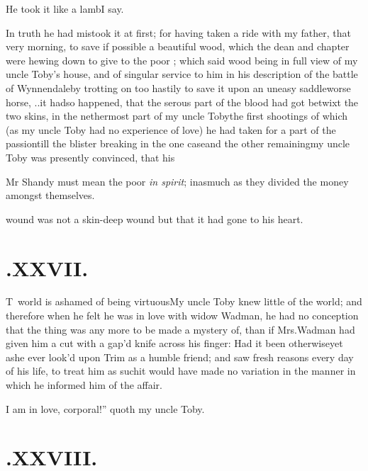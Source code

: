 \documentclass{article}
\begin{document}
He took it like a lamb\tsh I say.


In truth he had mistook it at first; for having taken a ride with my father, that
very morning, to save if possible a beautiful wood, which the dean and chapter were
hewing down to give to the poor \fnast;\break
which said wood
being in full view of my uncle Toby’s house, and of singular service to him in his
description of the battle of Wynnendale\tsk by trotting on too hastily to save it\tsh
upon an uneasy saddle\tsh worse horse, \etc \etc .\@ .\@  it had\break so happened, that the
serous part of the blood had got betwixt the two skins, in the nethermost part of my
uncle Toby\break\tsk the first shootings of which (as my uncle Toby had no
experience of love) he had taken for a part of the passion\tsk\break till the blister
breaking in the one case\tsk\break and the other remaining\tsk my uncle Toby was presently
convinced, that his{\par}

\bgroup\small
\indent\fnast\enspace Mr Shandy must mean the poor \textit{in spirit};
inasmuch as they divided the money amongst themselves.
\par\egroup
{}\eject

\noindent wound was not a skin-deep wound\tsh\break
but that it had gone to his heart.


\section{.\enspace XXVII.}

\lettrine{T}{\,} world is ashamed of being
vir\-tuous\tsh My uncle Toby knew little of the
world; and therefore when he felt he was in love with widow
Wadman, he had no conception that the thing was any more to
be made a mystery of, than if Mrs.\@ Wadman had given him a
cut with a gap’d knife across his finger: Had it been
otherwise\tsh yet as\break he ever look’d upon Trim
as a humble friend; and saw fresh reasons every day of his life, to
treat him as such\tsh it would have made no variation in
the manner in which he informed him of the\break
affair.\etp{}

\lqq I am in love, corporal!” quoth my uncle
Toby.

\section{.\enspace XXVIII.}
\end{document}
